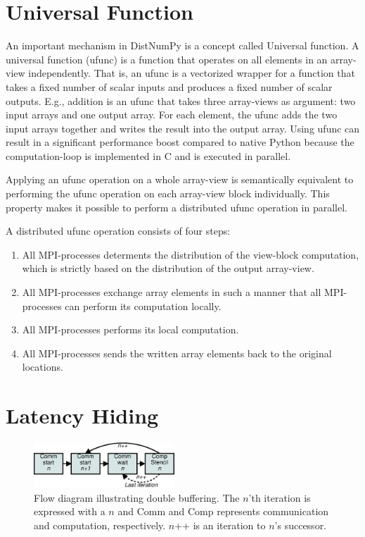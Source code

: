 \documentclass[preprint]{../PGAS10/sigplanconf}
\begin{document}
\section{Universal Function}
An important mechanism in DistNumPy is a concept called Universal function. A universal function (ufunc) is a function that operates on all elements in an array-view independently. That is, an ufunc is a vectorized wrapper for a function that takes a fixed number of scalar inputs and produces a fixed number of scalar outputs. E.g., addition is an ufunc that takes three array-views as argument: two input arrays and one output array. For each element, the ufunc adds the two input arrays together and writes the result into the output array. Using ufunc can result in a significant performance boost compared to native Python because the computation-loop is implemented in C and is executed in parallel.

Applying an ufunc operation on a whole array-view is semantically equivalent to performing the ufunc operation on each array-view block individually. This property makes it possible to perform a distributed ufunc operation in parallel. 

A distributed ufunc operation consists of four steps:
\begin{enumerate}
\item All MPI-processes determents the distribution of the view-block computation, which is strictly based on the distribution of the output array-view.
\item All MPI-processes exchange array elements in such a manner that all MPI-processes can perform its computation locally. 
\item All MPI-processes performs its local computation.
\item All MPI-processes sends the written array elements back to the original locations.
\end{enumerate}



\section{Latency Hiding}
\begin{figure}
 \centering
 \includegraphics[width=200px]{gfx/double_buffering}
 \caption{Flow diagram illustrating double buffering. The $n$'th iteration is expressed with a $n$ and Comm and Comp represents communication and computation, respectively. $n$++ is an iteration to $n$'s successor.}
 \label{fig:double_buffering}
\end{figure}
\end{document}
